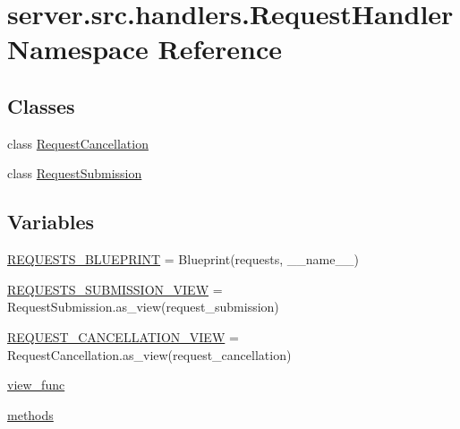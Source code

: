 \hypertarget{namespaceserver_1_1src_1_1handlers_1_1_request_handler}{}\section{server.\+src.\+handlers.\+Request\+Handler Namespace Reference}
\label{namespaceserver_1_1src_1_1handlers_1_1_request_handler}
\subsection*{Classes}
\begin{DoxyCompactItemize}
\item 
class \hyperlink{classserver_1_1src_1_1handlers_1_1_request_handler_1_1_request_cancellation}{Request\+Cancellation}
\item 
class \hyperlink{classserver_1_1src_1_1handlers_1_1_request_handler_1_1_request_submission}{Request\+Submission}
\end{DoxyCompactItemize}
\subsection*{Variables}
\begin{DoxyCompactItemize}
\item 
\hyperlink{namespaceserver_1_1src_1_1handlers_1_1_request_handler_a8f3307aca87ae4b6598fde1cac5d7b53}{R\+E\+Q\+U\+E\+S\+T\+S\+\_\+\+B\+L\+U\+E\+P\+R\+I\+NT} = Blueprint(\textquotesingle{}requests\textquotesingle{}, \+\_\+\+\_\+name\+\_\+\+\_\+)
\item 
\hyperlink{namespaceserver_1_1src_1_1handlers_1_1_request_handler_a4fae603f4baa0b065de14baee91974e3}{R\+E\+Q\+U\+E\+S\+T\+S\+\_\+\+S\+U\+B\+M\+I\+S\+S\+I\+O\+N\+\_\+\+V\+I\+EW} = Request\+Submission.\+as\+\_\+view(\textquotesingle{}request\+\_\+submission\textquotesingle{})
\item 
\hyperlink{namespaceserver_1_1src_1_1handlers_1_1_request_handler_a5465e803fcbab51b4b2dd5a0d6041cf2}{R\+E\+Q\+U\+E\+S\+T\+\_\+\+C\+A\+N\+C\+E\+L\+L\+A\+T\+I\+O\+N\+\_\+\+V\+I\+EW} = Request\+Cancellation.\+as\+\_\+view(\textquotesingle{}request\+\_\+cancellation\textquotesingle{})
\item 
\hyperlink{namespaceserver_1_1src_1_1handlers_1_1_request_handler_ab19dac7adef180b08d60d44162def139}{view\+\_\+func}
\item 
\hyperlink{namespaceserver_1_1src_1_1handlers_1_1_request_handler_aadc72d59d483d61efdb8c69b2e226e3c}{methods}
\end{DoxyCompactItemize}


